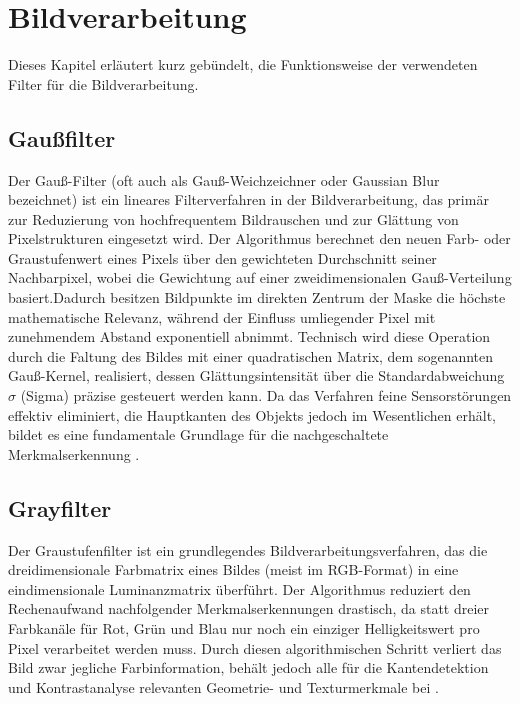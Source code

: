 \section{Bildverarbeitung}
\label{kap:Bildverarbeitung}
Dieses Kapitel erläutert kurz gebündelt, die Funktionsweise der verwendeten Filter für die Bildverarbeitung.

\subsection{Gaußfilter}
Der Gauß-Filter (oft auch als Gauß-Weichzeichner oder Gaussian Blur bezeichnet) ist ein lineares Filterverfahren in der Bildverarbeitung, das primär zur Reduzierung von hochfrequentem Bildrauschen und zur Glättung von Pixelstrukturen eingesetzt wird. Der Algorithmus berechnet den neuen Farb- oder Graustufenwert eines Pixels über den gewichteten Durchschnitt seiner Nachbarpixel, wobei die Gewichtung auf einer zweidimensionalen Gauß-Verteilung basiert.Dadurch besitzen Bildpunkte im direkten Zentrum der Maske die höchste mathematische Relevanz, während der Einfluss umliegender Pixel mit zunehmendem Abstand exponentiell abnimmt. Technisch wird diese Operation durch die Faltung des Bildes mit einer quadratischen Matrix, dem sogenannten Gauß-Kernel, realisiert, dessen Glättungsintensität über die Standardabweichung $\sigma$ (Sigma) präzise gesteuert werden kann. Da das Verfahren feine Sensorstörungen effektiv eliminiert, die Hauptkanten des Objekts jedoch im Wesentlichen erhält, bildet es eine fundamentale Grundlage für die nachgeschaltete Merkmalserkennung \cite{burger2022}.

\subsection{Grayfilter}
Der Graustufenfilter ist ein grundlegendes Bildverarbeitungsverfahren, das die dreidimensionale Farbmatrix eines Bildes (meist im RGB-Format) in eine eindimensionale Luminanzmatrix überführt. Der Algorithmus reduziert den Rechenaufwand nachfolgender Merkmalserkennungen drastisch, da statt dreier Farbkanäle für Rot, Grün und Blau nur noch ein einziger Helligkeitswert pro Pixel verarbeitet werden muss. Durch diesen algorithmischen Schritt verliert das Bild zwar jegliche Farbinformation, behält jedoch alle für die Kantendetektion und Kontrastanalyse relevanten Geometrie- und Texturmerkmale bei \cite{jaehne2023}.

